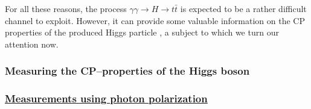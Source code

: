 For all these  reasons, the process $\gamma \gamma \to H \to t\bar{t}$ is 
expected to be a rather difficult channel to exploit. However, it can provide 
some valuable information on the CP properties of the produced Higgs particle
\cite{gam-Htt-Roh,gam-Htt-Asa1,gam-Htt-Asa2,gam-Htt-rev}, a subject to which we turn our 
attention now. 



\subsubsection{Measuring the CP--properties of the Higgs boson}

\subsubsection*{\underline{Measurements using photon polarization}} 


